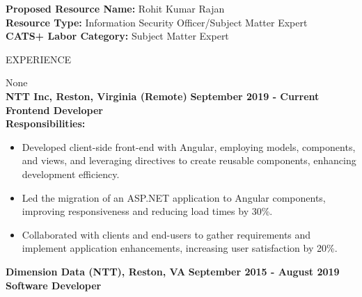\documentclass{resume} %
\begin{document}
\begin{flushleft}
    \textbf{Proposed Resource Name:} Rohit Kumar Rajan \\
    \textbf{Resource Type:} Information Security Officer/Subject Matter Expert \\
    \textbf{CATS+ Labor Category:} Subject Matter Expert
\end{flushleft}

\vspace{1.3em}

\begin{rSection}{EXPERIENCE}
        \begin{flushleft}
        None \\
        \vspace{1em} 
            \textbf{NTT Inc, Reston, Virginia (Remote)} \hfill \textbf{September 2019 {-} Current} \\
            \textbf{Frontend Developer} \\
            \vspace{1em}
            \textbf{Responsibilities:} \\
            \begin{itemize}
                                    \item Developed client{-}side front{-}end with Angular, employing models, components, and views, and leveraging directives to create reusable components, enhancing development efficiency.
                                    \item Led the migration of an ASP.NET application to Angular components, improving responsiveness and reducing load times by 30\%.
                                    \item Collaborated with clients and end{-}users to gather requirements and implement application enhancements, increasing user satisfaction by 20\%.
                            \end{itemize}
            \vspace{0.5em}
            \textbf{Dimension Data (NTT), Reston, VA} \hfill \textbf{September 2015 {-} August 2019} \\
            \textbf{Software Developer} \\

\end{flushleft}
\end{rSection}
\end{document}
